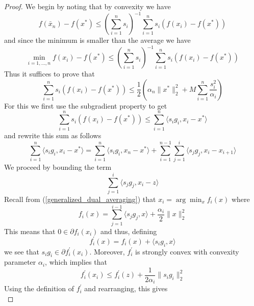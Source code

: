 \begin{proof}
 We begin by noting that by convexity we have
 \begin{equation}
  f(\bar{x}_n) - f(x^*) \leq \left(\displaystyle\sum_{i = 1}^n s_i\right)^{-1}\displaystyle\sum_{i = 1}^n s_i(f(x_i) - f(x^*))
 \end{equation}
 and since the minimum is smaller than the average we have
 \begin{equation}
  \min_{i = 1,...,n} f(x_i) - f(x^*) \leq \left(\displaystyle\sum_{i = 1}^n s_i\right)^{-1}\displaystyle\sum_{i = 1}^n s_i(f(x_i) - f(x^*))
 \end{equation}
 Thus it suffices to prove that
 \begin{equation}
  \displaystyle\sum_{i = 1}^n s_i(f(x_i) - f(x^*)) \leq \frac{1}{2}\left(\alpha_n\|x^*\|_2^2 + M\displaystyle\sum_{i = 1}^n \frac{s_i^2}{\alpha_i}\right)
 \end{equation}
 For this we first use the subgradient property to get
 \begin{equation}\label{eq_dual_averaging_59}
  \displaystyle\sum_{i = 1}^n s_i(f(x_i) - f(x^*)) \leq \displaystyle\sum_{i = 1}^n \langle s_ig_i, x_i - x^*\rangle
 \end{equation}
 and rewrite this sum as follows
 \begin{equation}\label{eq_dual_averaging_63}
  \displaystyle\sum_{i = 1}^n \langle s_ig_i, x_i - x^*\rangle = \displaystyle\sum_{i = 1}^n \langle s_ig_i, x_n - x^*\rangle
  + \displaystyle\sum_{i = 1}^{n-1} \displaystyle\sum_{j = 1}^i\langle s_jg_j, x_i - x_{i+1}\rangle 
 \end{equation}
 We proceed by bounding the term
 \begin{equation}
  \sum_{j = 1}^i\langle s_jg_j, x_i - z\rangle
 \end{equation}
 Recall from (\ref{generalized_dual_averaging}) that $x_i = \arg\min_x f_i(x)$ where
 \begin{equation}
  f_i(x) = \displaystyle\sum_{j = 1}^{i-1} \langle s_jg_j, x\rangle + \frac{\alpha_{i}}{2}\|x\|_2^2
 \end{equation}
 This means that $0\in\partial f_i(x_i)$ and thus, defining 
 $$f_i^\prime(x) = f_i(x) + \langle s_ig_i, x\rangle$$ 
 we see that $s_ig_i\in \partial f_i^\prime(x_i)$. Moreover, $f_i^\prime$ is strongly convex with convexity parameter
 $\alpha_i$, which implies that
 $$f_i^\prime(x_i) \leq f_i^\prime(z) + \frac{1}{2\alpha_i}\|s_ig_i\|_2^2
 $$
 Using the definition of $f_i^\prime$ and rearranging, this gives
 \begin{equation}

\end{equation}
\end{proof}
